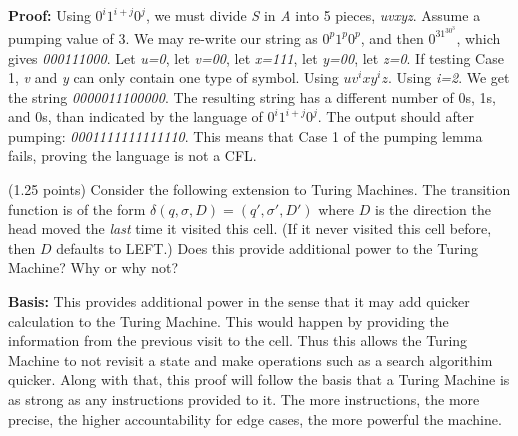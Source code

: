 \documentclass{article}
\begin{document}
\begin{compactenum}
\medskip
\textbf{Proof:} Using ${0^i1^{i+j}0^j }$, we must divide \emph{S} in \emph{A} into 5 pieces, \emph{uvxyz}.  Assume a pumping value of 3. We may re-write our string as \emph{${0^p1^p0^p}$}, and then \emph{${0^31^30^3}$}, which gives 
\emph{000111000}. Let \emph{u=0}, let \emph{v=00}, let \emph{x=111}, let \emph{y=00}, let \emph{z=0}. If testing Case 1, \emph {v} and \emph {y} can only contain one type of symbol.
 Using \emph{${uv^ixy^iz}$}. Using \emph{i=2}. We get the string \emph{0000011100000}. The resulting string has a different number of 0s, 1s, and 0s, than indicated by the language of  ${0^i1^{i+j}0^j }$. The output should after pumping: \emph{0001111111111110}. This means that Case 1 of the pumping lemma fails, proving the language is not a CFL.  

\medskip
\item (1.25 points) Consider the following extension to Turing Machines. The transition function is of the form $\delta(q,\sigma,D) = (q',\sigma',D')$ where $D$ is the direction the head moved the \emph{last} time it visited this cell. (If it never visited this cell before, then $D$ defaults to LEFT.) Does this provide additional power to the Turing Machine? Why or why not?

\medskip
\textbf{Basis:} This provides additional power in the sense that it may add quicker calculation to the Turing Machine. This would happen by providing the information from the previous visit to the cell. Thus this allows the Turing Machine to not revisit a state and make operations such as a search algorithim quicker.  Along with that, this proof will follow the basis that a Turing Machine is as strong as any instructions provided to it. The more instructions, the more precise, the higher accountability for edge cases, the more powerful the machine. 


\end{compactenum}
\end{document}
